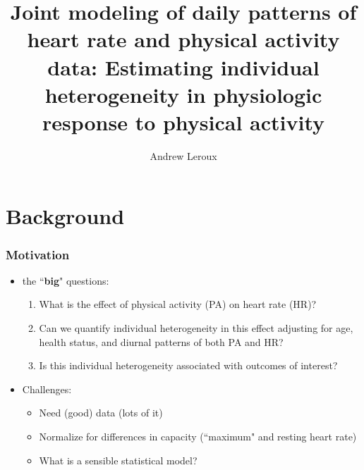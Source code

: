 \documentclass[10pt]{beamer}\usepackage[]{graphicx}\usepackage[]{color}
\newcommand\makebeamertitle{\frame{\maketitle}}%
\begin{document}
\title[]{Joint modeling of daily patterns of heart rate and physical activity data: Estimating individual heterogeneity in physiologic response to physical activity}
\author[]{Andrew Leroux}
\makebeamertitle






\section{Background}




\begin{frame}
\frametitle{Motivation}
\begin{itemize}
\item the ``\textbf{big}" questions: 
    \begin{enumerate}
    \item What is the effect of physical activity (PA) on heart rate (HR)? 
    \item Can we quantify individual heterogeneity in this effect adjusting for age, health status, and diurnal patterns of both PA and HR? 
    \item Is this individual heterogeneity associated with outcomes of interest? 
    \end{enumerate}
\item Challenges:
    \begin{itemize}
    \item Need (good) data (lots of it)
    \item Normalize for differences in capacity (``maximum" and resting heart rate)
    \item What is a sensible statistical model?
    \end{itemize}
\end{itemize}
\end{frame}
\end{document}
